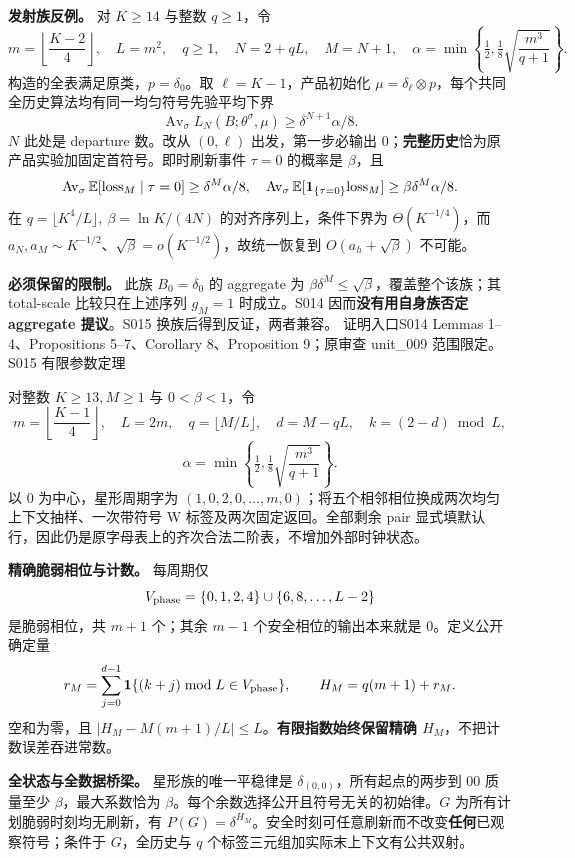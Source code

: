 \documentclass[11pt,a4paper]{article}
\newcommand{\head}[2]{{\small\sffamily #1}\par\vspace{2pt}{\LARGE\bfseries #2}\par\vspace{5pt}}
\newcommand{\entry}[1]{\vfill\noindent\small 证明入口\quad #1\normalsize}
\begin{document}
\textbf{发射族反例。} 对 $K\ge14$ 与整数 $q\ge1$，令
\[
 m=\left\lfloor\frac{K-2}{4}\right\rfloor,\quad L=m^2,\quad q\ge1,\quad
 N=2+qL,\quad M=N+1,\quad
 \alpha=\min\!\left\{\tfrac12,\tfrac18\sqrt{\frac{m^3}{q+1}}\right\}.
\]
构造的全表满足原类，$p=\delta_0$。取 $\ell=K-1$，产品初始化 $\mu=\delta_\ell\otimes p$，每个共同全历史算法均有同一均匀符号先验平均下界
\[
 \operatorname{Av}_{\sigma}L_N(B;\theta^\sigma,\mu)
 \ge\delta^{N+1}\alpha/8.
\]
$N$ 此处是 departure 数。改从 $(0,\ell)$ 出发，第一步必输出 0；\textbf{完整历史}恰为原产品实验加固定首符号。即时刷新事件 $\tau=0$ 的概率是 $\beta$，且
\[
 \operatorname{Av}_{\sigma}\mathbb E[\mathrm{loss}_M\mid\tau=0]\ge\delta^M\alpha/8,
 \quad
 \operatorname{Av}_{\sigma}\mathbb E[\mathbf1_{\{\tau=0\}}\mathrm{loss}_M]
 \ge\beta\delta^M\alpha/8.
\]
在 $q=\lfloor K^4/L\rfloor,\ \beta=\ln K/(4N)$ 的对齐序列上，条件下界为 $\Theta(K^{-1/4})$，而 $a_N,a_M\sim K^{-1/2}$、$\sqrt\beta=o(K^{-1/2})$，故统一恢复到 $O(a_h+\sqrt\beta)$ 不可能。

\textbf{必须保留的限制。} 此族 $B_0=\delta_0$ 的 aggregate 为 $\beta\delta^M\le\sqrt\beta$，覆盖整个该族；其 total-scale 比较只在上述序列 $g_M=1$ 时成立。S014 因而\textbf{没有用自身族否定 aggregate 提议}。S015 换族后得到反证，两者兼容。
\entry{S014 Lemmas 1--4、Propositions 5--7、Corollary 8、Proposition 9；原审查 unit\_009 范围限定。}
\newpage
\head{S015 有限参数定理}{安全零输出相位保留硬观察}
对整数 $K\ge13,M\ge1$ 与 $0<\beta<1$，令
\[
 m=\left\lfloor\frac{K-1}{4}\right\rfloor,\quad L=2m,\quad
 q=\lfloor M/L\rfloor,\quad d=M-qL,\quad k=(2-d)\bmod L,
\]
\[
 \alpha=\min\!\left\{\tfrac12,\tfrac18\sqrt{\frac{m^3}{q+1}}\right\}.
\]
以 0 为中心，星形周期字为 $(1,0,2,0,\ldots,m,0)$；将五个相邻相位换成两次均匀上下文抽样、一次带符号 W 标签及两次固定返回。全部剩余 pair 显式填默认行，因此仍是原字母表上的齐次合法二阶表，不增加外部时钟状态。

\textbf{精确脆弱相位与计数。} 每周期仅
\[
 V_{\rm phase}=\{0,1,2,4\}\cup\{6,8,\ldots,L-2\}
\]
是脆弱相位，共 $m+1$ 个；其余 $m-1$ 个安全相位的输出本来就是 0。定义公开确定量
\[
 r_M=\sum_{j=0}^{d-1}\mathbf1\{(k+j)\bmod L\in V_{\rm phase}\},
 \qquad H_M=q(m+1)+r_M.
\]
空和为零，且 $|H_M-M(m+1)/L|\le L$。\textbf{有限指数始终保留精确 $H_M$}，不把计数误差吞进常数。

\textbf{全状态与全数据桥梁。} 星形族的唯一平稳律是 $\delta_{(0,0)}$，所有起点的两步到 00 质量至少 $\beta$，最大系数恰为 $\beta$。每个余数选择公开且符号无关的初始律。$G$ 为所有计划脆弱时刻均无刷新，有 $P(G)=\delta^{H_M}$。安全时刻可任意刷新而不改变\textbf{任何}已观察符号；条件于 $G$，全历史与 $q$ 个标签三元组加实际末上下文有公共双射。
\end{document}
